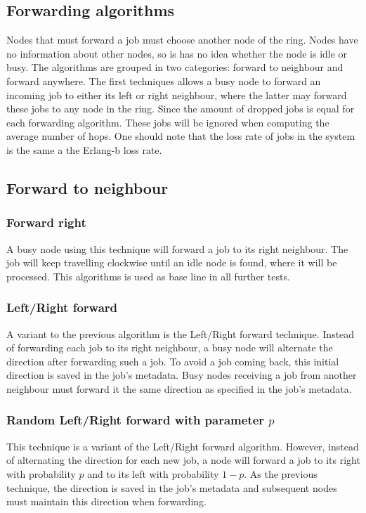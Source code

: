 \documentclass[10pt,a4paper,titlepage]{article}
\begin{document}
\subsection{Forwarding algorithms}
Nodes that must forward a job must choose another node of the ring. Nodes have no information about other nodes, so is has no idea whether the node is idle or busy. The algorithms are grouped in two categories: forward to neighbour and forward anywhere.
The first techniques allows a busy node to forward an incoming job to either its left or right neighbour, where the latter may forward these jobs to any node in the ring. 
Since the amount of dropped jobs is equal for each forwarding algorithm. These jobs will be ignored when computing the average number of hops. One should note that the loss rate of jobs in the system is the same a the Erlang-b loss rate.


\subsection{Forward to neighbour}
\subsubsection{Forward right}
A busy node using this technique will forward a job to its right neighbour. The job will keep travelling clockwise until an idle node is found, where it will be processed. This algorithms is used as base line in all further tests.

\subsubsection{Left/Right forward}
A variant to the previous algorithm is the Left/Right forward technique. Instead of forwarding each job to its right neighbour, a busy node will alternate the direction after forwarding such a job. To avoid a job coming back, this initial direction is saved in the job's metadata. Busy nodes receiving a job from another neighbour must forward it the same direction as specified in the job's metadata.

\subsubsection{Random Left/Right forward with parameter $p$}
This technique is a variant of the Left/Right forward algorithm. However, instead of alternating the direction for each new job, a node will forward a job to its right with probability $p$ and to its left with probability $1-p$. As the previous technique, the direction is saved in the job's metadata and subsequent nodes must maintain this direction when forwarding.
\end{document}
